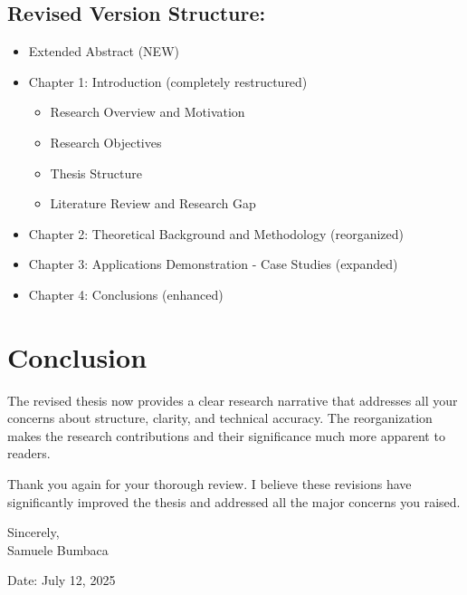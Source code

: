 \documentclass[11pt,a4paper]{article}
\begin{document}
\subsection{Revised Version Structure:}
\begin{itemize}
\item Extended Abstract (NEW)
\item Chapter 1: Introduction (completely restructured)
\begin{itemize}
\item Research Overview and Motivation
\item Research Objectives
\item Thesis Structure
\item Literature Review and Research Gap
\end{itemize}
\item Chapter 2: Theoretical Background and Methodology (reorganized)
\item Chapter 3: Applications Demonstration - Case Studies (expanded)
\item Chapter 4: Conclusions (enhanced)
\end{itemize}

\section{Conclusion}

The revised thesis now provides a clear research narrative that addresses all your concerns about structure, clarity, and technical accuracy. The reorganization makes the research contributions and their significance much more apparent to readers.

Thank you again for your thorough review. I believe these revisions have significantly improved the thesis and addressed all the major concerns you raised.

\vspace{1cm}

Sincerely,\\
Samuele Bumbaca

\vspace{0.5cm}

Date: July 12, 2025
\end{document}
